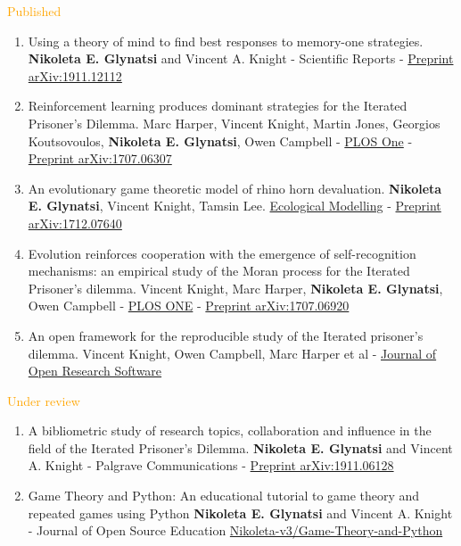 \documentclass{beamer}
\begin{document}
\begin{frame}
    \footnotesize{\textcolor{orange}{Published}}
    \tiny{
    \begin{enumerate}
    \def\labelenumi{\arabic{enumi}.}
    \item Using a theory of mind to find best responses to memory-one strategies. \textbf{Nikoleta E. Glynatsi} and Vincent A. Knight -
    Scientific Reports -
    \href{https://arxiv.org/abs/1911.12112}{Preprint arXiv:1911.12112}
    \item
    Reinforcement learning produces dominant strategies for
    the Iterated Prisoner's Dilemma. Marc Harper, Vincent Knight, Martin
    Jones, Georgios Koutsovoulos, \textbf{Nikoleta E. Glynatsi}, Owen Campbell -
    \href{https://journals.plos.org/plosone/article?id=10.1371/journal.pone.0188046}{PLOS
    One} -
    \href{https://arxiv.org/abs/1707.06307}{Preprint arXiv:1707.06307}
    \item
    An evolutionary game theoretic model of rhino horn
    devaluation. \textbf{Nikoleta E. Glynatsi}, Vincent Knight, Tamsin Lee.
    \href{https://www.sciencedirect.com/science/article/pii/S0304380018303260}{Ecological
    Modelling} -
    \href{https://arxiv.org/abs/1712.07640}{Preprint arXiv:1712.07640}
    \item
    Evolution reinforces cooperation with the emergence of
    self-recognition mechanisms: an empirical study of the Moran process
    for the Iterated Prisoner's dilemma. Vincent Knight, Marc Harper,
    \textbf{Nikoleta E. Glynatsi}, Owen Campbell -
    \href{https://journals.plos.org/plosone/article/comments?id=10.1371/journal.pone.0204981}{PLOS
    ONE} -
    \href{https://arxiv.org/abs/1707.06920}{Preprint arXiv:1707.06920}
    \item
    An open framework for the reproducible study of the
    Iterated prisoner's dilemma. Vincent Knight, Owen Campbell, Marc
    Harper et al -
    \href{https://openresearchsoftware.metajnl.com/articles/10.5334/jors.125/}{Journal
    of Open Research Software}
    \end{enumerate}
    }
    
    \footnotesize{\textcolor{orange}{Under review}}
    \tiny{
    \begin{enumerate} \def\labelenumi{\arabic{enumi}.}
        \item A bibliometric study of research topics, collaboration and influence in the field of the Iterated Prisoner's Dilemma.
        \textbf{Nikoleta E. Glynatsi} and Vincent A. Knight -
        Palgrave Communications - \href{https://arxiv.org/abs/1911.12112}{Preprint arXiv:1911.06128}
        \item Game Theory and Python: An educational tutorial to game
        theory and repeated games using Python \textbf{Nikoleta E. Glynatsi} and Vincent A. Knight -
        Journal of Open Source Education
        \href{https://github.com/Nikoleta-v3/Game-Theory-and-Python}{Nikoleta-v3/Game-Theory-and-Python}
    \end{enumerate}
    }
    

\end{frame}
\end{document}
